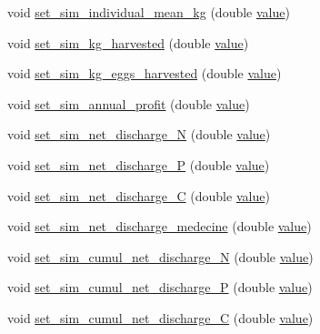 \begin{DoxyCompactItemize}
\item 
void \mbox{\hyperlink{class_fishfarm_a9322668eada3ad531c0c9897f640ad3f}{set\+\_\+sim\+\_\+individual\+\_\+mean\+\_\+kg}} (double \mbox{\hyperlink{diffusion_8cpp_a4b41795815d9f3d03abfc739e666d5da}{value}})
\item 
void \mbox{\hyperlink{class_fishfarm_aeb661d3c3b94e7488db8aab974d2504d}{set\+\_\+sim\+\_\+kg\+\_\+harvested}} (double \mbox{\hyperlink{diffusion_8cpp_a4b41795815d9f3d03abfc739e666d5da}{value}})
\item 
void \mbox{\hyperlink{class_fishfarm_abe3b06d04edcb2e144fd324b4ddeaf68}{set\+\_\+sim\+\_\+kg\+\_\+eggs\+\_\+harvested}} (double \mbox{\hyperlink{diffusion_8cpp_a4b41795815d9f3d03abfc739e666d5da}{value}})
\item 
void \mbox{\hyperlink{class_fishfarm_a181badf8c288fa84e94324707c93bc06}{set\+\_\+sim\+\_\+annual\+\_\+profit}} (double \mbox{\hyperlink{diffusion_8cpp_a4b41795815d9f3d03abfc739e666d5da}{value}})
\item 
void \mbox{\hyperlink{class_fishfarm_a4e062b531c458e2fd6b310490b49129a}{set\+\_\+sim\+\_\+net\+\_\+discharge\+\_\+N}} (double \mbox{\hyperlink{diffusion_8cpp_a4b41795815d9f3d03abfc739e666d5da}{value}})
\item 
void \mbox{\hyperlink{class_fishfarm_ab557d77ad4d966825cfe5ceca55d32d0}{set\+\_\+sim\+\_\+net\+\_\+discharge\+\_\+P}} (double \mbox{\hyperlink{diffusion_8cpp_a4b41795815d9f3d03abfc739e666d5da}{value}})
\item 
void \mbox{\hyperlink{class_fishfarm_a6747b53fdc3d3429fee9a2be37d1ed99}{set\+\_\+sim\+\_\+net\+\_\+discharge\+\_\+C}} (double \mbox{\hyperlink{diffusion_8cpp_a4b41795815d9f3d03abfc739e666d5da}{value}})
\item 
void \mbox{\hyperlink{class_fishfarm_add42b9fecaf35b92802b0b47f531cfd8}{set\+\_\+sim\+\_\+net\+\_\+discharge\+\_\+medecine}} (double \mbox{\hyperlink{diffusion_8cpp_a4b41795815d9f3d03abfc739e666d5da}{value}})
\item 
void \mbox{\hyperlink{class_fishfarm_a45fc053e6bf14e051bcc11a1cc170827}{set\+\_\+sim\+\_\+cumul\+\_\+net\+\_\+discharge\+\_\+N}} (double \mbox{\hyperlink{diffusion_8cpp_a4b41795815d9f3d03abfc739e666d5da}{value}})
\item 
void \mbox{\hyperlink{class_fishfarm_a417fee0d26d67ad764c7befa0214e2b3}{set\+\_\+sim\+\_\+cumul\+\_\+net\+\_\+discharge\+\_\+P}} (double \mbox{\hyperlink{diffusion_8cpp_a4b41795815d9f3d03abfc739e666d5da}{value}})
\item 
void \mbox{\hyperlink{class_fishfarm_aa38a1c92bec4b2b01b48b115a1bca011}{set\+\_\+sim\+\_\+cumul\+\_\+net\+\_\+discharge\+\_\+C}} (double \mbox{\hyperlink{diffusion_8cpp_a4b41795815d9f3d03abfc739e666d5da}{value}})

\end{DoxyCompactItemize}
